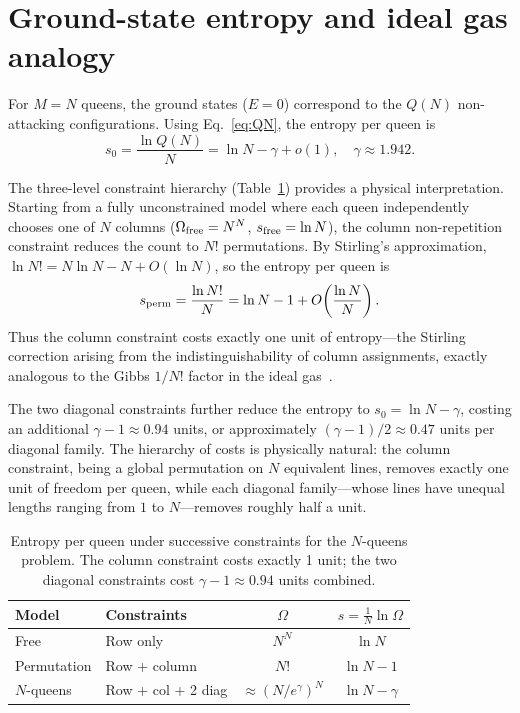 \documentclass[aps, pre, reprint, amsmath, amssymb, superscriptaddress, floatfix]{revtex4-2}
\begin{document}
\section{Ground-state entropy and ideal gas analogy}
\label{sec:entropy}

For $M = N$ queens, the ground states ($E = 0$) correspond to the
$Q(N)$ non-attacking configurations.  Using
Eq.~\eqref{eq:QN}, the entropy per queen is
\begin{equation}
  s_0 = \frac{\ln Q(N)}{N}
  = \ln N - \gamma + o(1), \quad \gamma \approx 1.942.
  \label{eq:s0}
\end{equation}

The three-level constraint hierarchy (Table~\ref{tab:entropy_levels})
provides a physical interpretation.  Starting from a fully
unconstrained model where each queen independently chooses one of $N$
columns ($\Omega_{\rm free} = N^N$, $s_{\rm free} = \ln N$), the
column non-repetition constraint reduces the count to $N!$
permutations.  By Stirling's approximation,
$\ln N! = N\ln N - N + O(\ln N)$, so the entropy per queen is
\begin{equation}
  s_{\rm perm} = \frac{\ln N!}{N}
  = \ln N - 1 + O\!\left(\frac{\ln N}{N}\right).
  \label{eq:s_perm}
\end{equation}
Thus the column constraint costs exactly one unit of entropy---the
Stirling correction arising from the indistinguishability of column
assignments, exactly analogous to the Gibbs $1/N!$ factor in the ideal
gas~\cite{Reif1965}.

The two diagonal constraints further reduce the entropy to
$s_0 = \ln N - \gamma$, costing an additional $\gamma - 1 \approx
0.94$ units, or approximately $(\gamma - 1)/2 \approx 0.47$ units
per diagonal family.  The hierarchy of costs is physically natural:
the column constraint, being a global permutation on $N$ equivalent
lines, removes exactly one unit of freedom per queen, while each
diagonal family---whose lines have unequal lengths ranging from $1$
to $N$---removes roughly half a unit.

\begin{table}[b]
  \caption{Entropy per queen under successive constraints for the
  $N$-queens problem.  The column constraint costs exactly 1 unit;
  the two diagonal constraints cost $\gamma - 1 \approx 0.94$ units
  combined.}
  \label{tab:entropy_levels}
  \begin{ruledtabular}
  \begin{tabular}{llcc}
    Model & Constraints & $\Omega$ & $s = \frac{1}{N}\ln\Omega$ \\
    \hline
    Free & Row only & $N^N$ & $\ln N$ \\
    Permutation & Row + column & $N!$ & $\ln N - 1$ \\
    $N$-queens & Row + col + 2 diag & $\approx (N/e^\gamma)^N$
      & $\ln N - \gamma$ \\
  \end{tabular}
  \end{ruledtabular}
\end{table}
\end{document}
